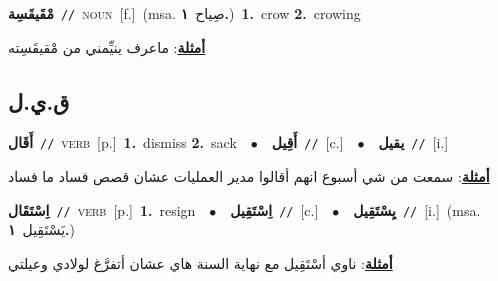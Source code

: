 \documentclass[10pt,a4paper,twoside]{article} %
\begin{document}
\begin{multicols}{2}
{\setlength\topsep{0pt}\textbf{\foreignlanguage{arabic}{مْقَيقَسِة}}\ {\color{gray}\texttt{//}\color{black}}\ \textsc{noun}\ [f.]\ \color{gray}(msa. \foreignlanguage{arabic}{صِياح}~\foreignlanguage{arabic}{\textbf{١.}})\color{black}\ \textbf{1.}~crow  \textbf{2.}~crowing\  \begin{flushright}\color{gray}\foreignlanguage{arabic}{\textbf{\underline{\foreignlanguage{arabic}{أمثلة}}}: ماعرف ينيِّمني من مْقيقَسِته}\end{flushright}\color{black}} \vspace{2mm}

\vspace{-3mm}
\subsection*{\color{blue}\foreignlanguage{arabic}{ق.ي.ل}\color{blue}{}} 

{\setlength\topsep{0pt}\textbf{\foreignlanguage{arabic}{أَقَال}}\ {\color{gray}\texttt{//}\color{black}}\ \textsc{verb}\ [p.]\ \textbf{1.}~dismiss  \textbf{2.}~sack\ \ $\bullet$\ \ \setlength\topsep{0pt}\textbf{\foreignlanguage{arabic}{أَقِيل}}\ {\color{gray}\texttt{//}\color{black}}\ [c.]\ \ $\bullet$\ \ \setlength\topsep{0pt}\textbf{\foreignlanguage{arabic}{يقيل}}\ {\color{gray}\texttt{//}\color{black}}\ [i.]\  \begin{flushright}\color{gray}\foreignlanguage{arabic}{\textbf{\underline{\foreignlanguage{arabic}{أمثلة}}}: سمعت من شي أسبوع انهم أقالوا مدير العمليات عشان قصص فساد ما فساد}\end{flushright}\color{black}} \vspace{2mm}

{\setlength\topsep{0pt}\textbf{\foreignlanguage{arabic}{اِسْتَقَال}}\ {\color{gray}\texttt{//}\color{black}}\ \textsc{verb}\ [p.]\ \textbf{1.}~resign\ \ $\bullet$\ \ \setlength\topsep{0pt}\textbf{\foreignlanguage{arabic}{اِسْتَقِيل}}\ {\color{gray}\texttt{//}\color{black}}\ [c.]\ \ $\bullet$\ \ \setlength\topsep{0pt}\textbf{\foreignlanguage{arabic}{يِسْتَقِيل}}\ {\color{gray}\texttt{//}\color{black}}\ [i.]\ \color{gray}(msa. \foreignlanguage{arabic}{يَسْتَقِيل}~\foreignlanguage{arabic}{\textbf{١.}})\color{black}\  \begin{flushright}\color{gray}\foreignlanguage{arabic}{\textbf{\underline{\foreignlanguage{arabic}{أمثلة}}}: ناوي أسْتَقِيل مع نهاية السنة هاي عشان أتفرَّغ لولادي وعيلتي}\end{flushright}\color{black}} \vspace{2mm}


\end{multicols}
\end{document}
